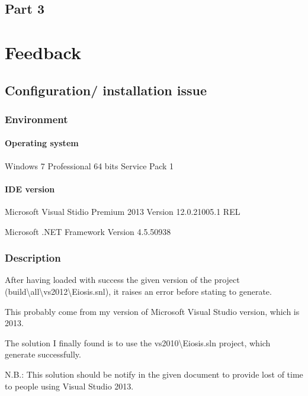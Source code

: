 \documentclass[10pt, a4paper]{article}
\begin{document}
\newpage
\subsection{Part 3}




\newpage
\section{Feedback}

\subsection{Configuration/ installation issue}

\subsubsection*{Environment}

\paragraph*{Operating system}
\begin{boxedverbatim}
	Windows 7 Professional 64 bits
	Service Pack 1
\end{boxedverbatim}
\paragraph*{IDE version}
\begin{boxedverbatim}
	Microsoft Visual Stidio Premium 2013
	Version 12.0.21005.1 REL
	
	Microsoft .NET Framework
	Version 4.5.50938
\end{boxedverbatim}

\subsubsection*{Description}

After having loaded with success the given version of the project (build\textbackslash all\textbackslash vs2012\textbackslash Eiosis.snl), it raises an error before stating to generate.

This probably come from my version of Microsoft Visual Studio version, which is 2013.

The solution I finally found is to use the vs2010\textbackslash Eiosis.sln project, which generate successfully.

\bigskip
N.B.: This solution should be notify in the given document to provide lost of time to people using Visual Studio 2013. 
\end{document}
